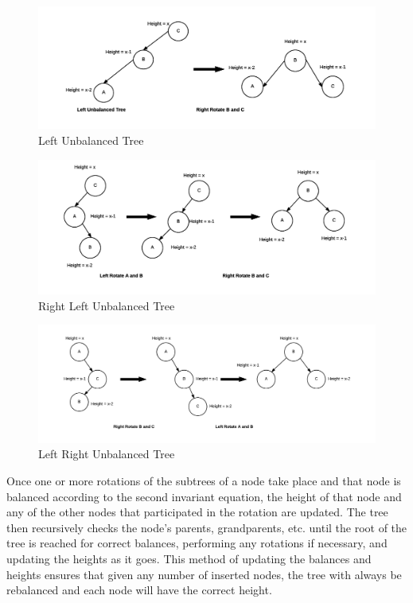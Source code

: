 \documentclass[12pt]{article}
\begin{document}
\noindent
\begin{figure}[h]
\caption{Left Unbalanced Tree}
\includegraphics[width=12cm]{left_unbalanced_tree.png}
\centering
\end{figure}
\noindent
\begin{figure}[h]
\caption{Right Left Unbalanced Tree}
\includegraphics[width=12cm]{right_left_unbalanced_tree.png}
\centering
\end{figure}
\noindent
\begin{figure}[h]
\caption{Left Right Unbalanced Tree}
\includegraphics[width=12cm]{left_right_unbalanced_tree.png}
\centering
\end{figure}
\noindent
Once one or more rotations of the subtrees of a node take place and that node
is balanced according to the second invariant equation, the height of that node
and any of the other nodes that participated in the rotation are updated.  The
tree then recursively checks the node's parents, grandparents, etc. 
until the root of the tree is reached for correct balances, performing any 
rotations if necessary, and updating the heights as it goes.  This method of
updating the balances and heights ensures that given any number of inserted
nodes, the tree with always be rebalanced and each node will
have the correct height.
\end{document}
